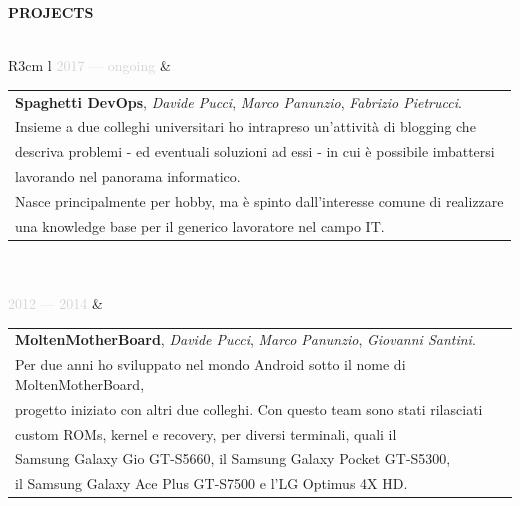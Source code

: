 \documentclass{article}
\begin{document}
\textbf{\textcolor{deepblue}{\uppercase{{{projects}}}}} \\\\ \hfill
\begin{tabular}{ R{3cm} l }
	\textcolor{lightgray}{2017 — {{ongoing}}} &
		\begin{tabular}[l]{@{}l@{}}
			\textbf{Spaghetti DevOps}, \textit{Davide Pucci}, \textit{Marco Panunzio}, \textit{Fabrizio Pietrucci}. \\
			Insieme a due colleghi universitari ho intrapreso un'attivit\`a di blogging che \\
			descriva problemi - ed eventuali soluzioni ad essi - in cui \`e possibile imbattersi \\
			lavorando nel panorama informatico. \\
			Nasce principalmente per hobby, ma \`e spinto dall'interesse comune di realizzare \\
			una knowledge base per il generico lavoratore nel campo IT.
		\end{tabular} \\\\ \hfill
	\textcolor{lightgray}{2012 — 2014} &
		\begin{tabular}[l]{@{}l@{}} %
			\textbf{MoltenMotherBoard}, \textit{Davide Pucci}, \textit{Marco Panunzio}, \textit{Giovanni Santini}. \\
			Per due anni ho sviluppato nel mondo Android sotto il nome di MoltenMotherBoard,                       \\
			progetto iniziato con altri due colleghi. Con questo team sono stati rilasciati                        \\
			custom ROMs, kernel e recovery, per diversi terminali, quali il                                        \\
			Samsung Galaxy Gio GT-S5660, il Samsung Galaxy Pocket GT-S5300,                                        \\
			il Samsung Galaxy Ace Plus GT-S7500 e l'LG Optimus 4X HD.
		\end{tabular} \\\\ \hfill
\end{tabular}
\end{document}
